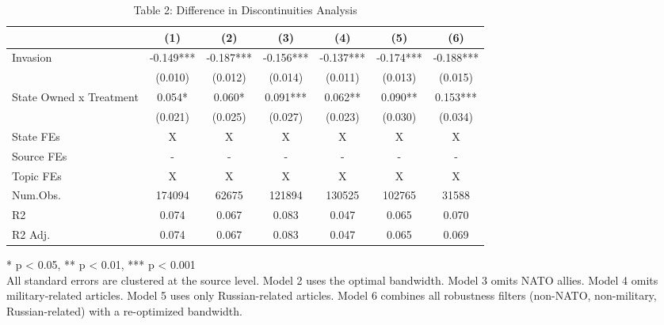 \begin{table}[!t]
\caption{Table 2: Difference in Discontinuities Analysis} 
\fontsize{12.0pt}{14.4pt}\selectfont
\begin{tabular*}{\linewidth}{@{\extracolsep{\fill}}lcccccc}
\toprule
  & (1) & (2) & (3) & (4) & (5) & (6) \\ 
\midrule\addlinespace[2.5pt]
Invasion & -0.149*** & -0.187*** & -0.156*** & -0.137*** & -0.174*** & -0.188*** \\ 
 & (0.010) & (0.012) & (0.014) & (0.011) & (0.013) & (0.015) \\ 
State Owned x Treatment & 0.054* & 0.060* & 0.091*** & 0.062** & 0.090** & 0.153*** \\ 
{} & {(0.021)} & {(0.025)} & {(0.027)} & {(0.023)} & {(0.030)} & {(0.034)} \\ 
State FEs & X & X & X & X & X & X \\ 
Source FEs & - & - & - & - & - & - \\ 
Topic FEs & X & X & X & X & X & X \\ 
Num.Obs. & 174094 & 62675 & 121894 & 130525 & 102765 & 31588 \\ 
R2 & 0.074 & 0.067 & 0.083 & 0.047 & 0.065 & 0.070 \\ 
R2 Adj. & 0.074 & 0.067 & 0.083 & 0.047 & 0.065 & 0.069 \\ 
\bottomrule
\end{tabular*}
\begin{minipage}{\linewidth}
* p < 0.05, ** p < 0.01, *** p < 0.001\\
All standard errors are clustered at the source level. Model 2 uses the optimal
bandwidth. Model 3 omits NATO allies. Model 4 omits military-related articles.
Model 5 uses only Russian-related articles. Model 6 combines all robustness
filters (non-NATO, non-military, Russian-related) with a re-optimized bandwidth.\\
\end{minipage}
\end{table}

